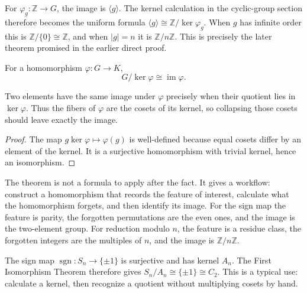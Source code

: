 \begin{example}
For \(\varphi_g:\mathbb Z\to G\), the image is \(\langle g\rangle\).  The
kernel calculation in the cyclic-group section therefore becomes the uniform
formula \(\langle g\rangle\cong\mathbb Z/\ker\varphi_g\).  When \(g\) has
infinite order this is \(\mathbb Z/\{0\}\cong\mathbb Z\), and when
\(|g|=n\) it is \(\mathbb Z/n\mathbb Z\).  This is precisely the later
theorem promised in the earlier direct proof.
\end{example}

\begin{theorem}
For a homomorphism \(\varphi:G\to K\),
\[
G/\ker\varphi\cong\operatorname{im}\varphi.
\]
\end{theorem}
\begin{proofidea}
Two elements have the same image under \(\varphi\) precisely when their
quotient lies in \(\ker\varphi\).  Thus the fibers of \(\varphi\) are the
cosets of its kernel, so collapsing those cosets should leave exactly the
image.
\end{proofidea}
\begin{proof}
The map \(g\ker\varphi\mapsto\varphi(g)\) is well-defined because equal cosets
differ by an element of the kernel.  It is a surjective homomorphism with
trivial kernel, hence an isomorphism.
\end{proof}

\begin{remark}
The theorem is not a formula to apply after the fact.  It gives a workflow:
construct a homomorphism that records the feature of interest, calculate what
the homomorphism forgets, and then identify its image.  For the sign map the
feature is parity, the forgotten permutations are the even ones, and the image
is the two-element group.  For reduction modulo \(n\), the feature is a
residue class, the forgotten integers are the multiples of \(n\), and the
image is \(\mathbb Z/n\mathbb Z\).
\end{remark}

\begin{example}
The sign map \(\operatorname{sgn}:S_n\to\{\pm1\}\) is surjective and has
kernel \(A_n\).  The First Isomorphism Theorem therefore gives
\(S_n/A_n\cong\{\pm1\}\cong C_2\).  This is a typical use: calculate a
kernel, then recognize a quotient without multiplying cosets by hand.
\end{example}

